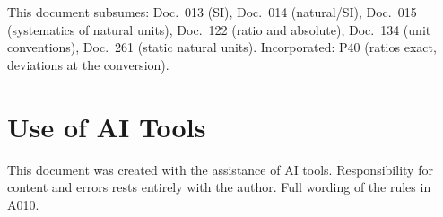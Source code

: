 This document subsumes: Doc.~013 (SI), Doc.~014 (natural/SI), Doc.~015
(systematics of natural units), Doc.~122 (ratio and absolute), Doc.~134
(unit conventions), Doc.~261 (static natural units). Incorporated: P40
(ratios exact, deviations at the conversion).

\section{Use of AI Tools}

This document was created with the assistance of AI tools.
Responsibility for content and errors rests entirely with the author.
Full wording of the rules in A010.
